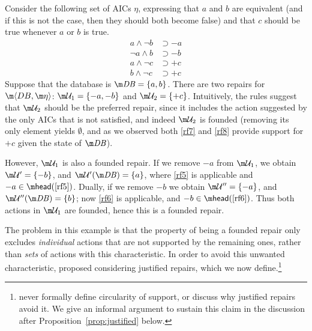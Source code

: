 \begin{example}
  \label{ex:founded}
  Consider the following set of AICs $\eta$, expressing that $a$ and $b$ are equivalent (and if this is not the case, then they should both become false) and that $c$ should be true whenever $a$ or $b$ is true.
  \begin{align}
    a\land\neg b &\supset{-a} \label{rf5} \\
    \neg a\land b &\supset{-b} \label{rf6} \\
    a\land\neg c &\supset{+c} \label{rf7} \\
    b\land\neg c &\supset{+c} \label{rf8} 
  \end{align}
  Suppose that the database is $\db=\{a,b\}$.
  There are two repairs for $\fulldb$: $\UU_1=\{{-a},{-b}\}$ and $\UU_2=\{{+c}\}$.
  Intuitively, the rules suggest that $\UU_2$ should be the preferred repair, since it includes the action suggested by the only AICs that is not satisfied, and indeed $\UU_2$ is founded (removing its only element yields $\emptyset$, and as we observed both \ref{rf7} and \ref{rf8} provide support for ${+c}$ given the state of $\db$).

  However, $\UU_1$ is also a founded repair.
  If we remove ${-a}$ from $\UU_1$, we obtain $\UU'=\{{-b}\}$, and $\UU'(\db)=\{a\}$, where \ref{rf5} is applicable and ${-a}\in\head(\ref{rf5})$.
  Dually, if we remove ${-b}$ we obtain $\UU''=\{{-a}\}$, and $\UU''(\db)=\{b\}$; now \ref{rf6} is applicable, and ${-b}\in\head(\ref{rf6})$.
  Thus both actions in $\UU_1$ are founded, hence this is a founded repair.
\end{example}

The problem in this example is that the property of being a founded repair only excludes \emph{individual} actions that are not supported by the remaining ones, rather than \emph{sets} of actions with this characteristic.
In order to avoid this unwanted characteristic, \citet{tplp/CaropreseT11} proposed considering justified repairs, which we now define.\footnote{\citet{tplp/CaropreseT11} never formally define circularity of support, or discuss why justified repairs avoid it. We give an informal argument to sustain this claim in the discussion after Proposition~\ref{prop:justified} below.}

